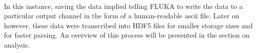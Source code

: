 \normalsize

\paragraph{}
In this instance, saving the data implied telling FLUKA to write the data to a particular output channel in the form of a human-readable ascii file. Later on however, these data were transcribed into HDF5 files for smaller storage sizes and for faster parsing. An overview of this process will be presented in the section on analysis.